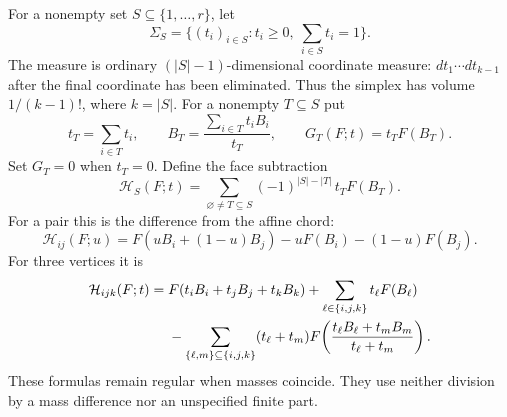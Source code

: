 \documentclass[11pt,a4paper]{article}
\numberwithin{equation}{section}
\theoremstyle{definition}
\theoremstyle{remark}
\begin{document}
For a nonempty set $S\subseteq\{1,\ldots,r\}$, let
\[
 \Sigma_S=\{(t_i)_{i\in S}:t_i\ge0,\ \sum_{i\in S}t_i=1\}.
\]
The measure is ordinary $(|S|-1)$-dimensional coordinate measure:
$dt_1\cdots dt_{k-1}$ after the final coordinate has been eliminated.
Thus the simplex has volume $1/(k-1)!$, where $k=|S|$.
For a nonempty $T\subseteq S$ put
\[
 t_T=\sum_{i\in T}t_i,\qquad
 B_T=\frac{\sum_{i\in T}t_i B_i}{t_T},\qquad
 G_T(F;t)=t_TF(B_T).
\]
Set $G_T=0$ when $t_T=0$.  Define the face subtraction
\begin{equation}\label{sd:eq:H}
 \boxed{\displaystyle
 \mathcal H_S(F;t)=
  \sum_{\varnothing\ne T\subseteq S}
       (-1)^{|S|-|T|}\,t_TF(B_T).}
\end{equation}
For a pair this is the difference from the affine chord:
\begin{equation}\label{sd:eq:Hpair}
 \mathcal H_{ij}(F;u)
   =F(uB_i+(1-u)B_j)-uF(B_i)-(1-u)F(B_j).
\end{equation}
For three vertices it is
\begin{align}\label{sd:eq:Htriple}
 \mathcal H_{ijk}(F;t)={}&F(t_iB_i+t_jB_j+t_kB_k)
                  +\sum_{\ell\in\{i,j,k\}}t_\ell F(B_\ell)\notag\\
 &-\sum_{\{\ell,m\}\subseteq\{i,j,k\}}
   (t_\ell+t_m)F\!\left(
            \frac{t_\ell B_\ell+t_mB_m}{t_\ell+t_m}\right).
\end{align}
These formulas remain regular when masses coincide.  They use neither
division by a mass difference nor an unspecified finite part.
\end{document}
